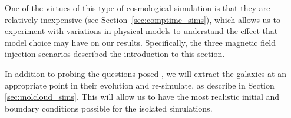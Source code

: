 One of the virtues of this type of cosmological simulation is that
they are relatively inexpensive (see Section~\ref{sec:comptime_sims}),
which allows us to experiment with variations in physical models to
understand the effect that model choice may have on our results.  Specifically,
the three magnetic field injection scenarios described the introduction to this
section.  

In addition to probing the questions posed , we will
extract the galaxies at an appropriate point in their evolution and re-simulate,
as describe in Section \ref{sec:molcloud_sims}.  This will allow us to have the
most realistic initial and boundary conditions possible for the isolated
simulations.




